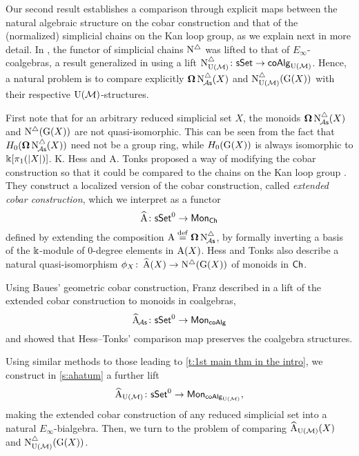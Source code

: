 Our second result establishes a comparison through explicit maps between the natural algebraic structure on the cobar construction and that of the (normalized) simplicial chains on the Kan loop group, as we explain next in more detail.
In \cite{mcclure2003multivariable, berger2004combinatorial}, the functor of simplicial chains $\operatorname{N^{\triangle}}$ was lifted to that of $E_{\infty}$-coalgebras, a result generalized in \cite{medina2020prop1} using a lift $\operatorname{N^{\triangle}_{{\operatorname{U}(\mathcal{M})}}} \colon \mathsf{sSet} \to \mathsf{coAlg}_{{\operatorname{U}(\mathcal{M})}}$.
Hence, a natural problem is to compare explicitly $\operatorname{\mathbf{\Omega}} \operatorname{N^{\triangle}_{\!{\mathcal{A}\mathsf{s}}}}(X)$ and $\operatorname{N^{\triangle}_{{\operatorname{U}(\mathcal{M})}}}(\operatorname{G}(X))$ with their respective ${\operatorname{U}(\mathcal{M})}$-structures.

First note that for an arbitrary reduced simplicial set $X$, the monoids $\operatorname{\mathbf{\Omega}} \operatorname{N^{\triangle}_{\!{\mathcal{A}\mathsf{s}}}}(X)$ and $\operatorname{N^{\triangle}}(\operatorname{G}(X))$ are not quasi-isomorphic.
This can be seen from the fact that $H_0(\operatorname{\mathbf{\Omega}} \operatorname{N^{\triangle}_{\!{\mathcal{A}\mathsf{s}}}}(X))$ need not be a group ring, while $H_0(\operatorname{G}(X))$ is always isomorphic to $ \Bbbk[\pi_1(|X|)]$.
K. Hess and A. Tonks proposed a way of modifying the cobar construction so that it could be compared to the chains on the Kan loop group \cite{hess2010cobar}.
They construct a localized version of the cobar construction, called \textit{extended cobar construction}, which we interpret as a functor
\[
\operatorname{\widehat{A}} \colon \mathsf{sSet}^0 \to \mathsf{Mon}_{\mathsf{Ch}}
\]
defined by extending the composition $\operatorname{A} \stackrel{\mathrm{def}}{=} \operatorname{\mathbf{\Omega}} \operatorname{N^{\triangle}_{\!{\mathcal{A}\mathsf{s}}}}$, by formally inverting a basis of the $\Bbbk$-module of $0$-degree elements in $\operatorname{A}(X)$.
Hess and Tonks also describe a natural quasi-isomorphism $\phi_X \colon \operatorname{\widehat{A}}(X) \to \operatorname{N^{\triangle}}(\operatorname{G}(X))$ of monoids in $\mathsf{Ch}$.

Using Baues’ geometric cobar construction, Franz described in \cite{franz2020szczarba} a lift of the extended cobar construction to monoids in coalgebras,
\[
\operatorname{\widehat{A}}_{\!{\mathcal{A}\mathsf{s}}} \colon \mathsf{sSet}^0 \to \mathsf{Mon}_{\mathsf{coAlg}}
\]
and showed that Hess--Tonks' comparison map preserves the coalgebra structures.

Using similar methods to those leading to \cref{t:1st main thm in the intro}, we construct in \cref{s:ahatum} a further lift
\[
\operatorname{\widehat{A}_{{\operatorname{U}(\mathcal{M})}}} \colon \mathsf{sSet}^0 \to \mathsf{Mon}_{\mathsf{coAlg}_{\operatorname{U}(\mathcal{M})}},
\]
making the extended cobar construction of any reduced simplicial set into a natural $E_\infty$-bialgebra.
Then, we turn to the problem of comparing $\operatorname{\widehat{A}_{{\operatorname{U}(\mathcal{M})}}}(X)$ and $\operatorname{N^{\triangle}_{{\operatorname{U}(\mathcal{M})}}}(\operatorname{G}(X))$.

